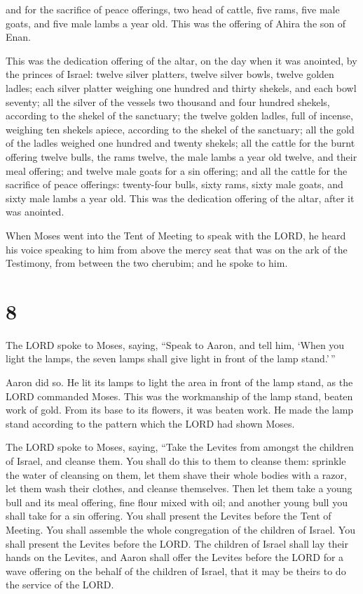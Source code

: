  and for the sacrifice of peace offerings, two head of
cattle, five rams, five male goats, and five male lambs a year old. This
was the offering of Ahira the son of Enan.

 This was the dedication offering of the altar, on the day
when it was anointed, by the princes of Israel: twelve silver platters,
twelve silver bowls, twelve golden ladles;  each silver
platter weighing one hundred and thirty shekels, and each bowl seventy;
all the silver of the vessels two thousand and four hundred shekels,
according to the shekel of the sanctuary;  the twelve
golden ladles, full of incense, weighing ten shekels apiece, according
to the shekel of the sanctuary; all the gold of the ladles weighed one
hundred and twenty shekels;  all the cattle for the burnt
offering twelve bulls, the rams twelve, the male lambs a year old
twelve, and their meal offering; and twelve male goats for a sin
offering;  and all the cattle for the sacrifice of peace
offerings: twenty-four bulls, sixty rams, sixty male goats, and sixty
male lambs a year old. This was the dedication offering of the altar,
after it was anointed.

 When Moses went into the Tent of Meeting to speak with the
LORD, he heard his voice speaking to him from above the mercy seat that
was on the ark of the Testimony, from between the two cherubim; and he
spoke to him.

\hypertarget{section-7}{%
\section{8}\label{section-7}}

 The LORD spoke to Moses, saying,  ``Speak to
Aaron, and tell him, `When you light the lamps, the seven lamps shall
give light in front of the lamp stand.'\,''

 Aaron did so. He lit its lamps to light the area in front
of the lamp stand, as the LORD commanded Moses.  This was
the workmanship of the lamp stand, beaten work of gold. From its base to
its flowers, it was beaten work. He made the lamp stand according to the
pattern which the LORD had shown Moses.

 The LORD spoke to Moses, saying,  ``Take the
Levites from amongst the children of Israel, and cleanse them.
 You shall do this to them to cleanse them: sprinkle the
water of cleansing on them, let them shave their whole bodies with a
razor, let them wash their clothes, and cleanse themselves. 
Then let them take a young bull and its meal offering, fine flour mixed
with oil; and another young bull you shall take for a sin offering.
 You shall present the Levites before the Tent of Meeting.
You shall assemble the whole congregation of the children of Israel.
 You shall present the Levites before the LORD. The
children of Israel shall lay their hands on the Levites, 
and Aaron shall offer the Levites before the LORD for a wave offering on
the behalf of the children of Israel, that it may be theirs to do the
service of the LORD.

